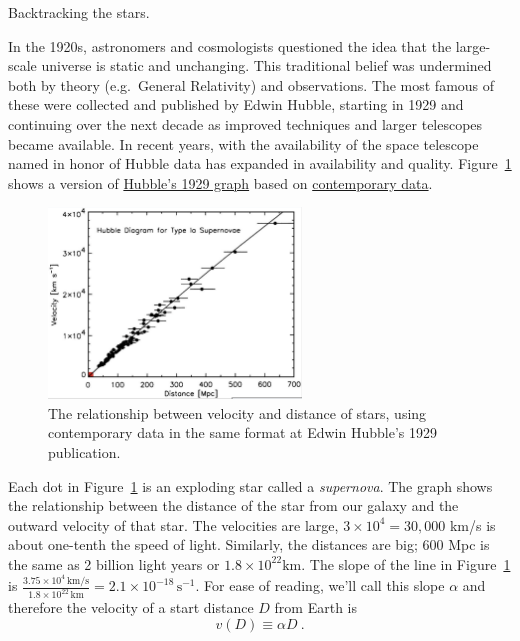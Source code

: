 \documentclass[
  letterpaper,
  DIV=11,
  numbers=noendperiod,
  oneside]{scrreprt}
\begin{document}
Backtracking the stars.

In the 1920s, astronomers and cosmologists questioned the idea that the
large-scale universe is static and unchanging. This traditional belief
was undermined both by theory (e.g.~General Relativity) and
observations. The most famous of these were collected and published by
Edwin Hubble, starting in 1929 and continuing over the next decade as
improved techniques and larger telescopes became available. In recent
years, with the availability of the space telescope named in honor of
Hubble data has expanded in availability and quality.
Figure~\ref{fig-hubble-curve} shows a version of
\href{https://www.pnas.org/content/15/3/168}{Hubble's 1929 graph} based
on
\href{https://www.ncbi.nlm.nih.gov/pmc/articles/PMC314128/}{contemporary
data}.

\begin{figure}

{\centering \includegraphics[width=0.6\textwidth,height=\textheight]{Accumulation/www/hubble-curve.png}

}

\caption{\label{fig-hubble-curve}The relationship between velocity and
distance of stars, using contemporary data in the same format at Edwin
Hubble's 1929 publication.}

\end{figure}

Each dot in Figure~\ref{fig-hubble-curve} is an exploding star called a
\emph{supernova}. The graph shows the relationship between the distance
of the star from our galaxy and the outward velocity of that star. The
velocities are large, \(3 \times 10^4 = 30,000\) km/s is about one-tenth
the speed of light. Similarly, the distances are big; 600 Mpc is the
same as 2 billion light years or \(1.8 \times 10^{22} \text{km}\). The
slope of the line in Figure~\ref{fig-hubble-curve} is
\(\frac{3.75 \times 10^4\, \text{km/s}}{1.8 \times 10^{22}\, \text{km}} = 2.1 \times 10^{-18}\, \text{s}^{-1}\).
For ease of reading, we'll call this slope \(\alpha\) and therefore the
velocity of a start distance \(D\) from Earth is
\[v(D) \equiv \alpha D\ .\]
\end{document}
